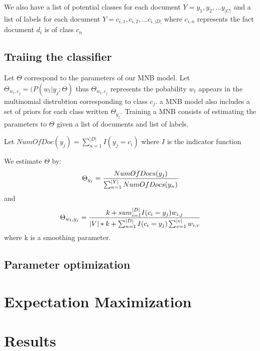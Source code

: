 \documentclass{article} %
\begin{document}
We also have a list of potential classes for each document $Y = {y_1,y_2,...y_{|C|}}$ and a list of labels for each document
$Y =  {c_{i,1},c_{i,2},...c_{i,|D|}}$ where $c_{i,n}$ represents the fact document $d_i$ is of class $c_n$

\subsection{Traiing the classifier}
Let $\Theta$ correspond to the parameters of our MNB model. Let $\Theta_{w_t,c_j} = (P(w_t|y_j;\Theta)$ thus $\Theta_{w_t,c_j}$
represents the pobability $w_t$ appears in the multinomial distrubtion corresponding to class $c_j$.  a MNB model also includes
a set of priors for each class written $\Theta_{y_j}$. 
Training a MNB consists of estimating the parameters to $\Theta$ given a list of documents and list of labels.

Let $NumOfDoc(y_j) = \sum_{n=1}^{|D|}I(y_j = c_i)$ where $I$ is the indicator function

We estimate $\Theta$ by:
 \[\Theta_{y_j}= {NumOfDocs(y_j)\over{\sum_{n=1}^{|Y|}NumOfDocs(y_n)}}\]
and 
\[\Theta_{w_t,y_j} = {k + sum_{i=1}^{|D|} I(c_i = y_j)w_{i,j}\over{|V| * k + \sum_{n=1}^{|D|}I(c_i = y_j)\sum_{v=1}^{|v|}w_{i,v}}}\]
where k is a smoothing parameter.
\subsection{Parameter optimization}


\section{Expectation Maximization}

\section{Results}
\end{document}
